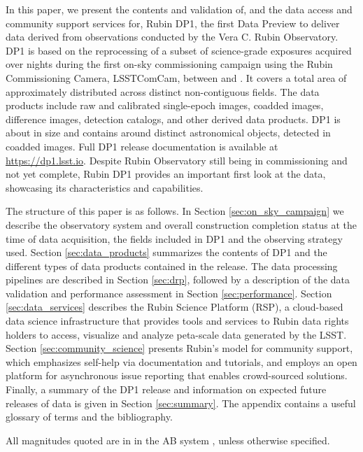 In this paper, we present the contents and validation of, and the data access and community support services for, Rubin \gls{DP1}, the first Data Preview to deliver data derived from observations conducted by the Vera C. Rubin Observatory.
\gls{DP1} is based on the reprocessing of a subset of \nexposures science-grade exposures acquired over \nnightscomcam nights during the first on-sky commissioning campaign using the Rubin Commissioning \gls{Camera}, \gls{LSSTComCam}, between \dponestartdate and \dponeenddate.
It covers a  total area of approximately \totalarea distributed across \nfields distinct non-contiguous fields.
The data products include raw and calibrated single-\gls{epoch} images, coadded images, difference images, detection catalogs, and other derived data products.
\gls{DP1} is about \sizeinbytes in size and contains around \nobjects distinct astronomical objects, detected in \ndeepcoadds coadded images.
Full \gls{DP1} release documentation is available at \url{https://dp1.lsst.io}.
Despite Rubin Observatory still being in commissioning and not yet complete, Rubin \gls{DP1} provides an important first look at the data, showcasing its characteristics and capabilities.

The structure of this paper is as follows.
In Section \ref{sec:on_sky_campaign} we describe the observatory system and overall construction completion status at the time of data acquisition, the \nfields fields included in \gls{DP1} and the observing strategy used.
Section \ref{sec:data_products} summarizes the contents of \gls{DP1} and the different types of data products contained in the release.
The data processing pipelines are described in Section \ref{sec:drp}, followed by a description of the data validation and performance assessment in Section \ref{sec:performance}.
Section \ref{sec:data_services} describes the Rubin \gls{Science Platform} (RSP), a \gls{cloud}-based data science infrastructure that provides tools and services to Rubin data rights holders to access, visualize and analyze peta-scale data generated by the \gls{LSST}.
Section \ref{sec:community_science} presents Rubin’s model for community support, which emphasizes self-help via documentation and tutorials, and employs an open platform for asynchronous issue reporting that enables crowd-sourced solutions.
Finally, a summary of the \gls{DP1} release and information on expected future releases of data is given in Section \ref{sec:summary}.
The appendix contains a useful glossary of terms and the bibliography.

All magnitudes quoted are in
in the AB system \citep{1983ApJ...266..713O}, unless otherwise specified.
